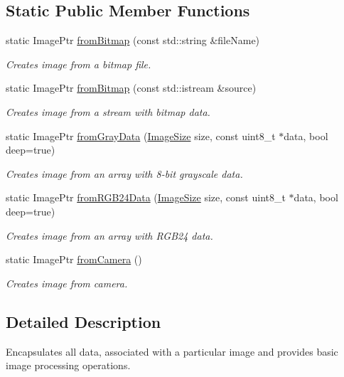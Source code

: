 \subsection*{Static Public Member Functions}
\begin{DoxyCompactItemize}
\item 
static ImagePtr \hyperlink{classipl_1_1Image_a79eb7a364c397be0fa9f7d8d792004b7}{fromBitmap} (const std::string \&fileName)
\begin{DoxyCompactList}\small\item\em Creates image from a bitmap file. \end{DoxyCompactList}\item 
static ImagePtr \hyperlink{classipl_1_1Image_a149ac729fa75f1b9b752ed2dcf35cbdf}{fromBitmap} (const std::istream \&source)
\begin{DoxyCompactList}\small\item\em Creates image from a stream with bitmap data. \end{DoxyCompactList}\item 
static ImagePtr \hyperlink{classipl_1_1Image_afd630b7530768e254cef83887bc41515}{fromGrayData} (\hyperlink{structipl_1_1ImageSize}{ImageSize} size, const uint8\_\-t $\ast$data, bool deep=true)
\begin{DoxyCompactList}\small\item\em Creates image from an array with 8-\/bit grayscale data. \end{DoxyCompactList}\item 
static ImagePtr \hyperlink{classipl_1_1Image_ae3344876efe13b7412f562aa44ace89f}{fromRGB24Data} (\hyperlink{structipl_1_1ImageSize}{ImageSize} size, const uint8\_\-t $\ast$data, bool deep=true)
\begin{DoxyCompactList}\small\item\em Creates image from an array with RGB24 data. \end{DoxyCompactList}\item 
static ImagePtr \hyperlink{classipl_1_1Image_abafd7caada828ae76251efa727729e2a}{fromCamera} ()
\begin{DoxyCompactList}\small\item\em Creates image from camera. \end{DoxyCompactList}\end{DoxyCompactItemize}


\subsection{Detailed Description}
Encapsulates all data, associated with a particular image and provides basic image processing operations. 

